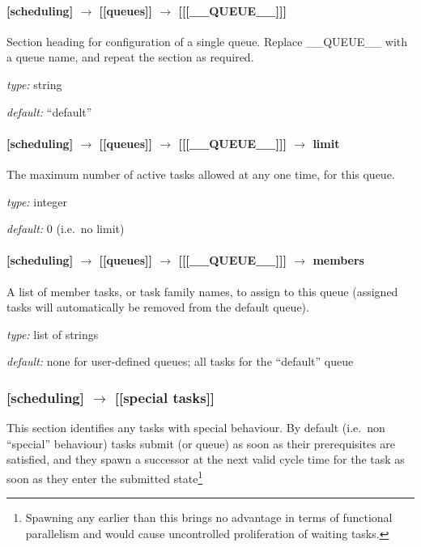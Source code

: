 \paragraph[{[[[}\_\_QUEUE\_\_{]]]}]{[scheduling] $\rightarrow$ [[queues]] $\rightarrow$ [[[\_\_QUEUE\_\_]]]}

Section heading for configuration of a single queue. Replace
\_\_QUEUE\_\_ with a queue name, and repeat the section as required.

\begin{myitemize}
\item {\em type:} string
\item {\em default:} ``default''
\end{myitemize}

\paragraph[limit]{[scheduling] $\rightarrow$ [[queues]] $\rightarrow$ [[[\_\_QUEUE\_\_]]] $\rightarrow$ limit}

The maximum number of active tasks allowed at any one time, for this queue.
\begin{myitemize}
\item {\em type:} integer
\item {\em default:} 0 (i.e.\ no limit)
\end{myitemize}

\paragraph[members]{[scheduling] $\rightarrow$ [[queues]] $\rightarrow$ [[[\_\_QUEUE\_\_]]] $\rightarrow$ members}

A list of member tasks, or task family names, to assign to this queue
(assigned tasks will automatically be removed from the default queue).
\begin{myitemize}
\item {\em type:} list of strings
\item {\em default:} none for user-defined queues; all tasks for the ``default'' queue
\end{myitemize}

\subsubsection[{[[}special tasks{]]}]{[scheduling] $\rightarrow$ [[special tasks]]}

This section identifies any tasks with special behaviour. By default
(i.e.\ non ``special'' behaviour) tasks submit (or queue) as soon as
their prerequisites are satisfied, and they spawn a successor at the
next valid cycle time for the task as soon as they enter the submitted 
state\footnote{Spawning any earlier than this brings no advantage in
terms of functional parallelism and would cause uncontrolled
proliferation of waiting tasks.}

